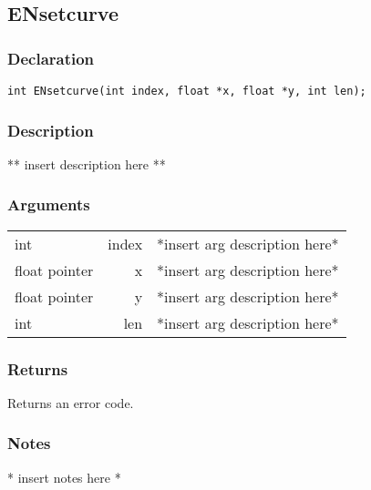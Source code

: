 \subsection{ENsetcurve}
\subsubsection{Declaration}
\begin{lstlisting}
int ENsetcurve(int index, float *x, float *y, int len);
\end{lstlisting}
\subsubsection{Description}
** insert description here **
\subsubsection{Arguments}
\begin{tabular}{l r p{11cm} }
int&index&*insert arg description here* \\[6pt]
float pointer&x&*insert arg description here* \\[6pt]
float pointer&y&*insert arg description here* \\[6pt]
int&len&*insert arg description here* \\[6pt]
\end{tabular}
\subsubsection{Returns}
Returns an error code.
\subsubsection{Notes}
* insert notes here *